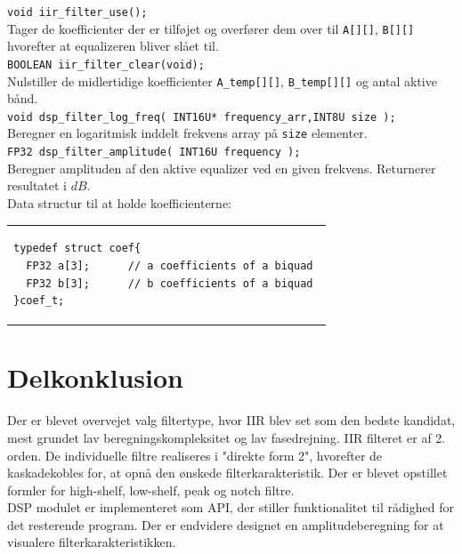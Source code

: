 \texttt{void iir\_filter\_use();} \\
Tager de koefficienter der er tilføjet og overfører dem over til \texttt{A[][]}, \texttt{B[][]} hvorefter at equalizeren bliver slået til.\\

\texttt{BOOLEAN iir\_filter\_clear(void);} \\ 
Nulstiller de midlertidige koefficienter \texttt{A\_temp[][]}, \texttt{B\_temp[][]} og antal aktive bånd. \\

\texttt{void dsp\_filter\_log\_freq( INT16U* frequency\_arr,INT8U size );} \\ 
Beregner en logaritmisk inddelt frekvens array på \texttt{size} elementer. \\

\texttt{FP32 dsp\_filter\_amplitude( INT16U frequency );}\\
Beregner amplituden af den aktive equalizer ved en given frekvens. Returnerer resultatet i $dB$. \\

Data structur til at holde koefficienterne:\\
\begin{tabular}{l}
\begin{lstlisting}
typedef struct coef{
  FP32 a[3];      // a coefficients of a biquad
  FP32 b[3];      // b coefficients of a biquad 
}coef_t;
\end{lstlisting}
\end{tabular}




\section{Delkonklusion}
Der er blevet overvejet valg filtertype, hvor IIR blev set som den bedste kandidat, mest grundet lav beregningskompleksitet og lav fasedrejning. IIR filteret er af 2. orden. De individuelle filtre realiseres i "direkte form 2", hvorefter de kaskadekobles for, at opnå den ønskede filterkarakteristik. Der er blevet opstillet formler for high-shelf, low-shelf, peak og notch filtre.
\\
DSP modulet er implementeret som API, der stiller funktionalitet til rådighed for det resterende program. Der er endvidere designet en amplitudeberegning for at visualere filterkarakteristikken.

